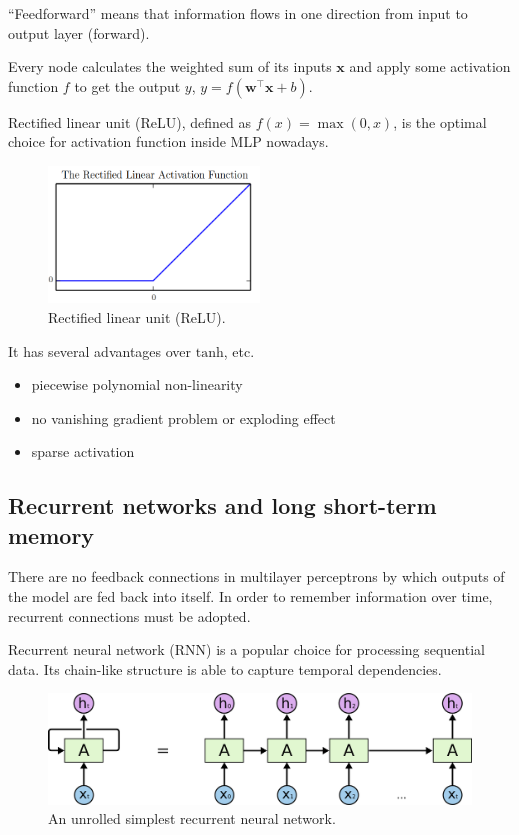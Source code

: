 \documentclass[11pt,a4paper]{report}
\begin{document}
\enquote{Feedforward} means that information flows in one direction from input to output layer (forward).

Every node calculates the weighted sum of its inputs \(\mathbf{x}\) and apply some activation function \(f\) to get the output \(y\), \( y = f (\mathbf{w}^\intercal \mathbf{x} + b) \).

Rectified linear unit (ReLU), defined as \(f(x) = \max(0, x)\), is the optimal choice for activation function inside MLP nowadays.

\begin{figure}[htbp]
  \centering
  \includegraphics[width=0.5\textwidth]{relu.png}
  \caption{Rectified linear unit (ReLU).} \label{fig:relu}
\end{figure}

It has several advantages over \(\mathrm{tanh}\), etc.

\begin{itemize}
  \item piecewise polynomial non-linearity
  \item no vanishing gradient problem or exploding effect
  \item sparse activation
\end{itemize}

\subsection{Recurrent networks and long short-term memory}

There are no feedback connections in multilayer perceptrons by which outputs of the model are fed back into itself.
In order to remember information over time, recurrent connections must be adopted.

Recurrent neural network (RNN) is a popular choice for processing sequential data.
Its chain-like structure is able to capture temporal dependencies.

\begin{figure}[htbp]
  \centering
  \includegraphics[width=\textwidth]{RNN-unrolled.png}
  \caption{An unrolled simplest recurrent neural network.} \label{fig:rnn-intro}
\end{figure}
\end{document}
